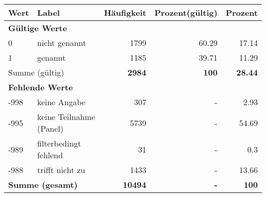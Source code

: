      \begin{longtable}{lXrrr}
     \toprule
     \textbf{Wert} & \textbf{Label} & \textbf{Häufigkeit} & \textbf{Prozent(gültig)} & \textbf{Prozent} \\
     \endhead
     \midrule
     \multicolumn{5}{l}{\textbf{Gültige Werte}}\\

     0 &
     \multicolumn{1}{X}{ nicht genannt   } &


       \num{1799} &
       \num[round-mode=places,round-precision=2]{60.29} &
         \num[round-mode=places,round-precision=2]{17.14} \\

     1 &
     \multicolumn{1}{X}{ genannt   } &


       \num{1185} &
       \num[round-mode=places,round-precision=2]{39.71} &
         \num[round-mode=places,round-precision=2]{11.29} \\
     \midrule
     \multicolumn{2}{l}{Summe (gültig)} &
       \textbf{\num{2984}} &
     \textbf{\num{100}} &
       \textbf{\num[round-mode=places,round-precision=2]{28.44}} \\
     \multicolumn{5}{l}{\textbf{Fehlende Werte}}\\
       -998 &
       keine Angabe &
         \num{307} &
        - &
         \num[round-mode=places,round-precision=2]{2.93} \\
       -995 &
       keine Teilnahme (Panel) &
         \num{5739} &
        - &
         \num[round-mode=places,round-precision=2]{54.69} \\
       -989 &
       filterbedingt fehlend &
         \num{31} &
        - &
         \num[round-mode=places,round-precision=2]{0.3} \\
       -988 &
       trifft nicht zu &
         \num{1433} &
        - &
         \num[round-mode=places,round-precision=2]{13.66} \\
     \midrule
     \multicolumn{2}{l}{\textbf{Summe (gesamt)}} &
          \textbf{\num{10494}} &
        \textbf{-} &
        \textbf{\num{100}} \\
     \bottomrule
     \end{longtable}
     

